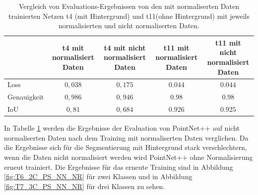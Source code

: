 \documentclass[12pt,titlepage, twoside]{article}
\begin{document}
\begin{table}
    \begin{center}
    \begin{tabular}{|l || c | c || c | c | } 
        \hline
         & \thead{t4 mit \\ normalisiert Daten}  & \thead{t4 mit nicht \\ normalisiert Daten} & \thead{t11 mit \\ normalisiert Daten} & \thead{t11 mit nicht \\ normalisiert Daten}  \\  
        \hline
        \hline
        Loss & $0,038$ & $0,175$& $0.044$& $0.044$\\
        \hline
        Genauigkeit & $0,986$& $0,946$& $0.98$& $0.98$\\
        \hline
        IoU & $0,81$& $0,684$& $0.926$& $0.925$\\
        \hline
    \end{tabular}
    \end{center}
    \caption{Vergleich von Evaluations-Ergebnissen von den mit normaliserten Daten trainierten Netzen t4 (mit Hintergrund) und t11(ohne Hintergrund) mit jeweils normalisierten und nicht normaliserten Daten.}
    \label{tab:segmentation:normalization:compare}
\end{table}

In Tabelle \ref{tab:segmentation:normalization:compare} werden die Ergebnisse der Evaluation von PointNet++ auf nicht normaliserten Daten nach dem Training mit normaliserten Daten verglichen.
Da die Ergebnisse sich für die Segmentierung mit Hintergrund stark verschlechtern, wenn die Daten nicht normalisiert werden wird PointNet++ ohne Normalisierung erneut trainiert. 
Die Ergebnisse für das erneute Training sind in Abbildung \ref{fig:T6_2C_PS_NN_NR} für zwei Klassen und in Abbildung \ref{fig:T7_3C_PS_NN_NR} für drei Klassen zu sehen.
\end{document}
